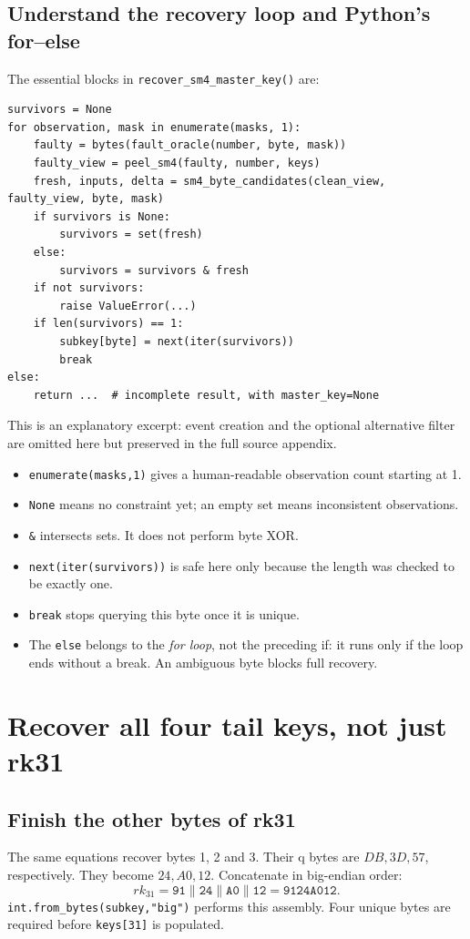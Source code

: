 \documentclass[11pt,a4paper]{report}
\newcommand{\hx}[1]{\texttt{#1}}
\begin{document}
\section{Understand the recovery loop and Python's for--else}
The essential blocks in \texttt{recover\_sm4\_master\_key()} are:
\begin{Verbatim}
survivors = None
for observation, mask in enumerate(masks, 1):
    faulty = bytes(fault_oracle(number, byte, mask))
    faulty_view = peel_sm4(faulty, number, keys)
    fresh, inputs, delta = sm4_byte_candidates(clean_view, faulty_view, byte, mask)
    if survivors is None:
        survivors = set(fresh)
    else:
        survivors = survivors & fresh
    if not survivors:
        raise ValueError(...)
    if len(survivors) == 1:
        subkey[byte] = next(iter(survivors))
        break
else:
    return ...  # incomplete result, with master_key=None
\end{Verbatim}
This is an explanatory excerpt: event creation and the optional alternative filter are omitted here but preserved in the full source appendix.
\begin{itemize}
\item \texttt{enumerate(masks,1)} gives a human-readable observation count starting at 1.
\item \texttt{None} means no constraint yet; an empty set means inconsistent observations.
\item \texttt{\&} intersects sets. It does not perform byte XOR.
\item \texttt{next(iter(survivors))} is safe here only because the length was checked to be exactly one.
\item \texttt{break} stops querying this byte once it is unique.
\item The \texttt{else} belongs to the \emph{for loop}, not the preceding if: it runs only if the loop ends without a break. An ambiguous byte blocks full recovery.
\end{itemize}

\chapter{Recover all four tail keys, not just rk31}
\section{Finish the other bytes of rk31}
The same equations recover bytes 1, 2 and 3. Their q bytes are \(DB,3D,57\), respectively. They become \(24,A0,12\). Concatenate in big-endian order:
\[rk_{31}=\hx{91}\parallel\hx{24}\parallel\hx{A0}\parallel\hx{12}=\hx{9124A012}.\]
\texttt{int.from\_bytes(subkey,"big")} performs this assembly. Four unique bytes are required before \texttt{keys[31]} is populated.
\end{document}
